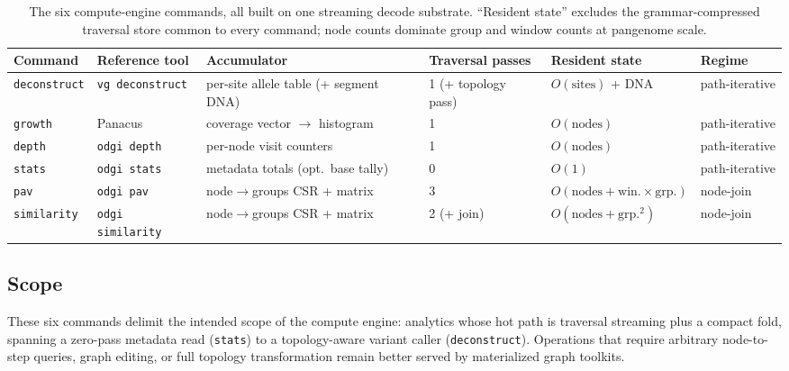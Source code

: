 \begin{table}[t]
  \centering
  \caption{The six compute-engine commands, all built on one streaming decode
  substrate. ``Resident state'' excludes the grammar-compressed traversal store
  common to every command; node counts dominate group and window counts at
  pangenome scale.}
  \label{tab:ce-commands}
  \small
  \begin{tabular}{@{}llllll@{}}
    \toprule
    Command & Reference tool & Accumulator & Traversal passes & Resident state & Regime \\
    \midrule
    \texttt{deconstruct} & \texttt{vg deconstruct} & per-site allele table (+ segment DNA) & 1 (+ topology pass) & $O(\text{sites})$ + DNA & path-iterative \\
    \texttt{growth}      & Panacus               & coverage vector $\to$ histogram      & 1                   & $O(\text{nodes})$         & path-iterative \\
    \texttt{depth}       & \texttt{odgi depth}   & per-node visit counters              & 1                   & $O(\text{nodes})$         & path-iterative \\
    \texttt{stats}       & \texttt{odgi stats}   & metadata totals (opt.\ base tally)   & 0                   & $O(1)$                    & path-iterative \\
    \texttt{pav}         & \texttt{odgi pav}     & node$\to$groups CSR + matrix         & 3                   & $O(\text{nodes}+\text{win.}{\times}\text{grp.})$ & node-join \\
    \texttt{similarity}  & \texttt{odgi similarity} & node$\to$groups CSR + matrix      & 2 (+ join)          & $O(\text{nodes}+\text{grp.}^2)$ & node-join \\
    \bottomrule
  \end{tabular}
\end{table}

\subsection{Scope}\label{subsec:ce-scope}

These six commands delimit the intended scope of the compute engine: analytics whose
hot path is traversal streaming plus a compact fold, spanning a zero-pass metadata
read (\texttt{stats}) to a topology-aware variant caller (\texttt{deconstruct}).
Operations that require arbitrary node-to-step queries, graph editing, or full
topology transformation remain better served by materialized graph toolkits.
